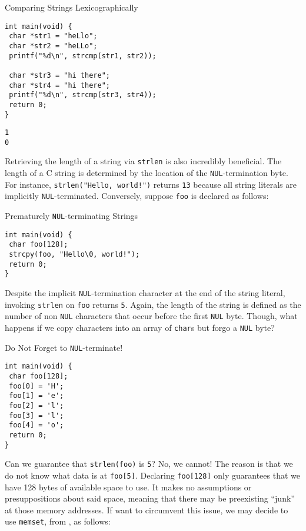 \begin{cloast}[main.c]{Comparing Strings Lexicographically}\begin{lstlisting}[language=MyC]
int main(void) {
 char *str1 = "heLlo";
 char *str2 = "heLLo";
 printf("%d\n", strcmp(str1, str2));

 char *str3 = "hi there";
 char *str4 = "hi there";
 printf("%d\n", strcmp(str3, str4));
 return 0;
}
\end{lstlisting}
\tcblower
\begin{lstlisting}[language=MyOutput]
1
0
\end{lstlisting}
\end{cloast}

Retrieving the length of a string via \texttt{strlen} is also incredibly beneficial. The length of a C string is determined by the location of the \texttt{NUL}-termination byte. For instance, \texttt{strlen("Hello, world!")} returns \texttt{13} because all string literals are implicitly \texttt{NUL}-terminated. Conversely, suppose \texttt{foo} is declared as follows:

\begin{cl}[main.c]{Prematurely \texttt{NUL}-terminating Strings}\begin{lstlisting}[language=MyC]
int main(void) {
 char foo[128];
 strcpy(foo, "Hello\0, world!");
 return 0;
}
\end{lstlisting}\end{cl}

Despite the implicit \texttt{NUL}-termination character at the end of the string literal, invoking \texttt{strlen} on \texttt{foo} returns \texttt{5}. Again, the length of the string is defined as the number of non \texttt{NUL} characters that occur before the first \texttt{NUL} byte. Though, what happens if we copy characters into an array of \texttt{char}s but forgo a \texttt{NUL} byte?

\begin{cl}[main.c]{Do Not Forget to \texttt{NUL}-terminate!}\begin{lstlisting}[language=MyC]
int main(void) {
 char foo[128];
 foo[0] = 'H';
 foo[1] = 'e';
 foo[2] = 'l';
 foo[3] = 'l';
 foo[4] = 'o';
 return 0;
}
\end{lstlisting}\end{cl}

Can we guarantee that \texttt{strlen(foo)} is \texttt{5}? No, we cannot! The reason is that we do not know what data is at \texttt{foo[5]}. Declaring \texttt{foo[128]} only guarantees that we have 128 bytes of available space to use. It makes no assumptions or presuppositions about said space, meaning that there may be preexisting ``junk'' at those memory addresses. If want to circumvent this issue, we may decide to use \texttt{memset}, from , as follows:

